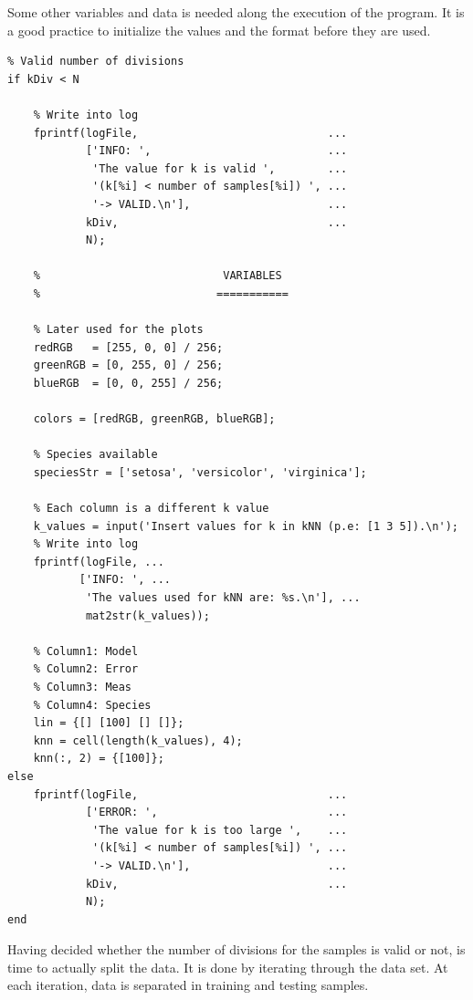 \documentclass[11pt]{article}
\begin{document}
Some other variables and data is needed along the execution of the program. It
is a good practice to initialize the values and the format before they are used.

\begin{verbatim}
% Valid number of divisions
if kDiv < N
    
    % Write into log
    fprintf(logFile,                             ...
            ['INFO: ',                           ...
             'The value for k is valid ',        ...
             '(k[%i] < number of samples[%i]) ', ...
             '-> VALID.\n'],                     ...
            kDiv,                                ...
            N);
    
    %                            VARIABLES
    %                           ===========
    
    % Later used for the plots
    redRGB   = [255, 0, 0] / 256;
    greenRGB = [0, 255, 0] / 256;
    blueRGB  = [0, 0, 255] / 256;
    
    colors = [redRGB, greenRGB, blueRGB];
          
    % Species available
    speciesStr = ['setosa', 'versicolor', 'virginica'];
    
    % Each column is a different k value
    k_values = input('Insert values for k in kNN (p.e: [1 3 5]).\n');
    % Write into log
    fprintf(logFile, ...
           ['INFO: ', ...
            'The values used for kNN are: %s.\n'], ...
            mat2str(k_values));
    
    % Column1: Model
    % Column2: Error
    % Column3: Meas
    % Column4: Species
    lin = {[] [100] [] []};
    knn = cell(length(k_values), 4);
    knn(:, 2) = {[100]};
else
    fprintf(logFile,                             ...
            ['ERROR: ',                          ...
             'The value for k is too large ',    ...
             '(k[%i] < number of samples[%i]) ', ...
             '-> VALID.\n'],                     ...
            kDiv,                                ...
            N);
end
\end{verbatim}

Having decided whether the number of divisions for the samples is valid or not,
is time to actually split the data. It is done by iterating through the data
set. At each iteration, data is separated in training and testing samples.
 
\end{document}
